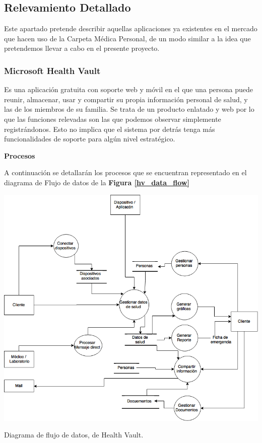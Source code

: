 \clearpage
\subsection{Relevamiento Detallado}
Este apartado pretende describir aquellas aplicaciones ya existentes en el mercado que hacen uso de la Carpeta Médica Personal, de un modo similar a la idea que pretendemos llevar a cabo en el presente proyecto.


\subsubsection{Microsoft Health Vault}
	 Es una aplicación gratuita con soporte web y móvil en el que una persona puede reunir, almacenar, usar y compartir su propia información personal de salud, y las de los miembros de su familia. Se trata de un producto enlatado y web por lo que las funciones relevadas son las que podemos observar simplemente registrándonos.
     Esto no implica que el sistema por detrás tenga más funcionalidades de soporte para algún nivel estratégico.
{\correccionTexto	
\textbf{Procesos}


A continuación se detallarán los procesos que se encuentran representado en el diagrama de Flujo de datos de la \textbf{Figura \ref{hv_data_flow}}
}
	\begin{correccionFigure}[h]
      \centering
      \includegraphics[width=.8\textwidth]{img/tp1/hv_flujo_de_datos}
      \caption{Diagrama de flujo de datos, de Health Vault.}
      \label{hv_data_flow}
    \end{correccionFigure} 


